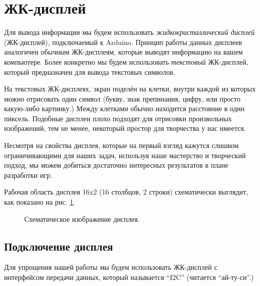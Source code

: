 \documentclass[../sparc.tex]{subfiles}
\begin{document}
\section{ЖК-дисплей}

Для вывода информации мы будем использовать \emph{жидкокристаллический дисплей}
(ЖК-дисплей), подключаемый к Arduino.  Принцип работы данных дисплеев аналогичен
обычным ЖК-дисплеям, которые выводят информацию на вашем компьютере.  Более
конкретно мы будем использовать \emph{текстовый} ЖК-дисплей, который
предназначен для вывода текстовых символов.

На текстовых ЖК-дисплеях, экран поделён на клетки, внутри каждой из которых
можно отрисовать один символ (букву, знак препинания, цифру, или просто
какую-либо картинку.)  Между клетками обычно находится расстояние в один
пиксель.  Подобные дисплеи плохо подходят для отрисовки произвольных
изображений, тем не менее, некоторый простор для творчества у нас имеется.

Несмотря на свойства дисплея, которые на первый взгляд кажутся слишком
ограничивающими для наших задач, используя наше мастерство и творческий подход,
мы можем добиться достаточно интересных результатов в плане разработки игр.

Рабочая область дисплея 16x2 (16 столбцов, 2 строки) схематически выглядит, как
показано на рис. \ref{fig:lcd-schematics}.

\begin{figure}[ht]
  \centering
  \caption{Схематическое изображение дисплея.}
  \label{fig:lcd-schematics}
\end{figure}

\subsection{Подключение дисплея}

Для упрощения нашей работы мы будем использовать ЖК-дисплей с интерфейсом
передачи данных, который называется ``I2C'' (читается ``ай-ту-си''.)
\end{document}
